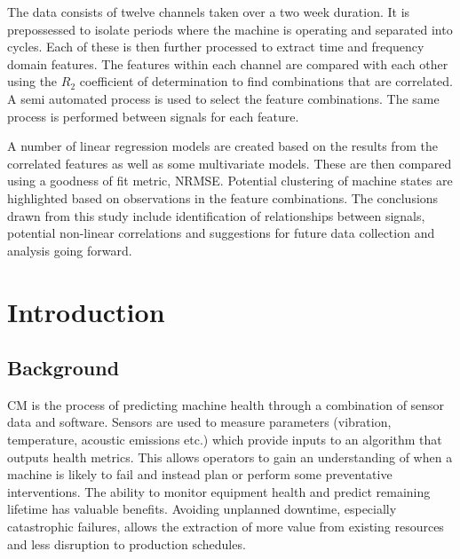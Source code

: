 \documentclass[]{article}
\begin{document}
The data consists of twelve channels taken over a two week duration. It is prepossessed to isolate periods where the machine is operating and separated into cycles. Each of these is then further processed to extract time and frequency domain features. The features within each channel are compared with each other using the $R_2$ coefficient of determination to find combinations that are correlated. A semi automated process is used to select the feature combinations. The same process is performed between signals for each feature. 

A number of linear regression models are created based on the results from the correlated features as well as some multivariate models. These are then compared using a goodness of fit metric, \gls{NRMSE}. Potential clustering of machine states are highlighted based on observations in the feature combinations. The conclusions drawn from this study include identification of relationships between signals, potential non-linear correlations and suggestions for future data collection and analysis going forward.
\clearpage

\setcounter{tocdepth}{3}
\tableofcontents
\newpage

\listoffigures
\listoftables
\newpage

\printnoidxglossary[type=\acronymtype, style=list, nogroupskip=true]
\newpage


\section{Introduction}
\subsection{Background}
\gls{CM} is the process of predicting machine health through a combination of sensor data and software. Sensors are used to measure parameters (vibration, temperature, acoustic emissions etc.) which provide inputs to an algorithm that outputs health metrics. This allows operators to gain an understanding of when a machine is likely to fail and instead plan or perform some preventative interventions. The ability to monitor equipment health and predict remaining lifetime has valuable benefits. Avoiding unplanned downtime, especially catastrophic failures, allows the extraction of more value from existing resources and less disruption to production schedules.
\end{document}
